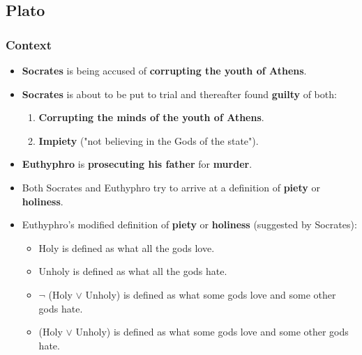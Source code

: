 \documentclass[11pt]{article}
\begin{document}
\subsection{Plato}
\label{sec:org534f71b}

\subsubsection{Context}
\label{sec:org4819e3e}
\begin{itemize}
\item \textbf{Socrates} is being accused of \textbf{corrupting the youth of Athens}.
\item \textbf{Socrates} is about to be put to trial and thereafter found \textbf{guilty} of both:
\begin{enumerate}
\item \textbf{Corrupting the minds of the youth of Athens}.
\item \textbf{Impiety} ("not believing in the Gods of the state").
\end{enumerate}
\item \textbf{Euthyphro} is \textbf{prosecuting his father} for \textbf{murder}.
\item Both Socrates and Euthyphro try to arrive at a definition of \textbf{piety} or \textbf{holiness}.
\item Euthyphro's modified definition of \textbf{piety} or \textbf{holiness} (suggested by Socrates):
\begin{itemize}
\item Holy is defined as what all the gods love.
\item Unholy is defined as what all the gods hate.
\item \(\neg\) (Holy \(\vee\) Unholy) is defined as what some gods love and some other gods hate.
\item (Holy \(\vee\) Unholy) is defined as what some gods love and some other gods hate.
\end{itemize}
\end{itemize}
\end{document}
